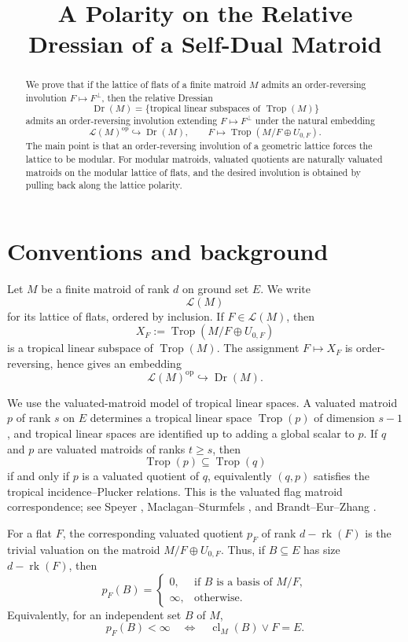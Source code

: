 \documentclass[11pt]{article}
\title{A Polarity on the Relative Dressian of a Self-Dual Matroid}
\author{}
\date{}
\newcommand{\Trop}{\operatorname{Trop}}
\newcommand{\Dr}{\operatorname{Dr}}
\newcommand{\rk}{\operatorname{rk}}
\newcommand{\cl}{\operatorname{cl}}
\newcommand{\cL}{\mathcal L}
\theoremstyle{plain}
\theoremstyle{definition}
\begin{document}
\maketitle

\begin{abstract}
We prove that if the lattice of flats of a finite matroid \(M\) admits an order-reversing involution \(F\mapsto F^\perp\), then the relative Dressian
\[
   \Dr(M)=\{\text{tropical linear subspaces of }\Trop(M)\}
\]
admits an order-reversing involution extending \(F\mapsto F^\perp\) under the natural embedding
\[
   \cL(M)^{\operatorname{op}}\hookrightarrow \Dr(M),\qquad
   F\longmapsto \Trop(M/F\oplus U_{0,F}).
\]
The main point is that an order-reversing involution of a geometric lattice forces the lattice to be modular.  For modular matroids, valuated quotients are naturally valuated matroids on the modular lattice of flats, and the desired involution is obtained by pulling back along the lattice polarity.
\end{abstract}

\section{Conventions and background}

Let \(M\) be a finite matroid of rank \(d\) on ground set \(E\).  We write
\[
  \cL(M)
\]
for its lattice of flats, ordered by inclusion.  If \(F\in \cL(M)\), then
\[
  X_F:=\Trop(M/F\oplus U_{0,F})
\]
is a tropical linear subspace of \(\Trop(M)\).  The assignment \(F\mapsto X_F\) is order-reversing, hence gives an embedding
\[
   \cL(M)^{\operatorname{op}}\hookrightarrow \Dr(M).
\]

We use the valuated-matroid model of tropical linear spaces.  A valuated matroid \(p\) of rank \(s\) on \(E\) determines a tropical linear space \(\Trop(p)\) of dimension \(s-1\), and tropical linear spaces are identified up to adding a global scalar to \(p\).  If \(q\) and \(p\) are valuated matroids of ranks \(t\ge s\), then
\[
   \Trop(p)\subseteq \Trop(q)
\]
if and only if \(p\) is a valuated quotient of \(q\), equivalently \((q,p)\) satisfies the tropical incidence--Plucker relations.  This is the valuated flag matroid correspondence; see Speyer \cite{SpeyerTLS}, Maclagan--Sturmfels \cite[Ch.~4]{MS}, and Brandt--Eur--Zhang \cite{BEZ}.

For a flat \(F\), the corresponding valuated quotient \(p_F\) of rank \(d-\rk(F)\) is the trivial valuation on the matroid \(M/F\oplus U_{0,F}\).  Thus, if \(B\subseteq E\) has size \(d-\rk(F)\), then
\[
   p_F(B)=
   \begin{cases}
   0, & \text{if } B \text{ is a basis of }M/F,\\
   \infty, & \text{otherwise}.
   \end{cases}
\]
Equivalently, for an independent set \(B\) of \(M\),
\[
   p_F(B)<\infty
   \quad\Longleftrightarrow\quad
   \cl_M(B)\vee F=E.
\]
\end{document}
